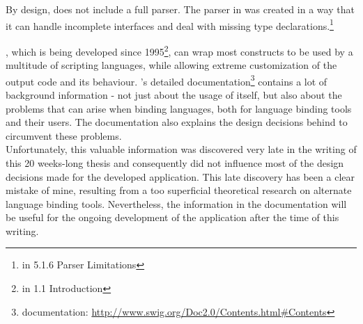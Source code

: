 By design,  does not include a full  parser. The parser in  was created in a way that it can handle incomplete interfaces and deal with missing type declarations.\footnote{\citep{SWIGHPDoc} in 5.1.6 Parser Limitations}

, which is being developed since 1995\footnote{\citep{SWIGHPDoc} in 1.1 Introduction}, can wrap most  constructs to be used by a multitude of scripting languages, while allowing extreme customization of the output code and its behaviour. 's detailed documentation\footnote{ documentation: \url{http://www.swig.org/Doc2.0/Contents.html\#Contents}} contains a lot of background information - not just about the usage of  itself, but also about the problems that can arise when binding languages, both for language binding tools and their users. The documentation also explains the design decisions behind  to circumvent these problems.
\\Unfortunately, this valuable information was discovered very late in the writing of this 20 weeks-long thesis and consequently did not influence most of the design decisions made for the developed application. This late discovery has been a clear mistake of mine, resulting from a too superficial theoretical research on alternate language binding tools. Nevertheless, the information in the documentation will be useful for the ongoing development of the application after the time of this writing.

